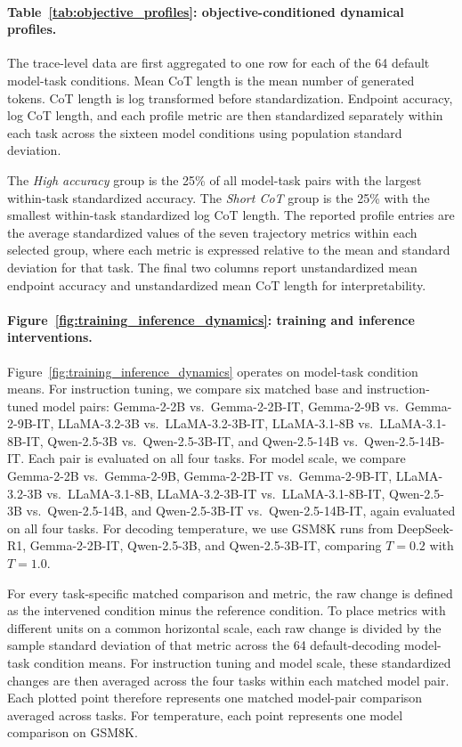 \documentclass{article}
\begin{document}
\paragraph{Table~\ref{tab:objective_profiles}: objective-conditioned dynamical profiles.}
The trace-level data are first aggregated to one row for each of the 64 default model-task conditions. Mean CoT length is the mean number of generated tokens. CoT length is log transformed before standardization. Endpoint accuracy, log CoT length, and each profile metric are then standardized separately within each task across the sixteen model conditions using population standard deviation.

The \emph{High accuracy} group is the 25\% of all model-task pairs with the largest within-task standardized accuracy. The \emph{Short CoT} group is the 25\% with the smallest within-task standardized log CoT length. The reported profile entries are the average standardized values of the seven trajectory metrics within each selected group, where each metric is expressed relative to the mean and standard deviation for that task. The final two columns report unstandardized mean endpoint accuracy and unstandardized mean CoT length for interpretability.

\paragraph{Figure~\ref{fig:training_inference_dynamics}: training and inference interventions.}
Figure~\ref{fig:training_inference_dynamics} operates on model-task condition means. For instruction tuning, we compare six matched base and instruction-tuned model pairs: Gemma-2-2B vs.\ Gemma-2-2B-IT, Gemma-2-9B vs.\ Gemma-2-9B-IT, LLaMA-3.2-3B vs.\ LLaMA-3.2-3B-IT, LLaMA-3.1-8B vs.\ LLaMA-3.1-8B-IT, Qwen-2.5-3B vs.\ Qwen-2.5-3B-IT, and Qwen-2.5-14B vs.\ Qwen-2.5-14B-IT. Each pair is evaluated on all four tasks. For model scale, we compare Gemma-2-2B vs.\ Gemma-2-9B, Gemma-2-2B-IT vs.\ Gemma-2-9B-IT, LLaMA-3.2-3B vs.\ LLaMA-3.1-8B, LLaMA-3.2-3B-IT vs.\ LLaMA-3.1-8B-IT, Qwen-2.5-3B vs.\ Qwen-2.5-14B, and Qwen-2.5-3B-IT vs.\ Qwen-2.5-14B-IT, again evaluated on all four tasks. For decoding temperature, we use GSM8K runs from DeepSeek-R1, Gemma-2-2B-IT, Qwen-2.5-3B, and Qwen-2.5-3B-IT, comparing $T=0.2$ with $T=1.0$.

For every task-specific matched comparison and metric, the raw change is defined as the intervened condition minus the reference condition. To place metrics with different units on a common horizontal scale, each raw change is divided by the sample standard deviation of that metric across the 64 default-decoding model-task condition means. For instruction tuning and model scale, these standardized changes are then averaged across the four tasks within each matched model pair. Each plotted point therefore represents one matched model-pair comparison averaged across tasks. For temperature, each point represents one model comparison on GSM8K.
\end{document}
